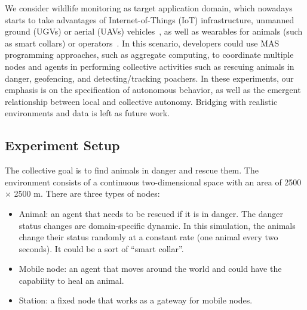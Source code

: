 \documentclass[jsan,article,accept,moreauthors,pdftex]{Definitions/mdpi}
\begin{document}
\begin{paracol}{2}
We consider {wildlife monitoring} as target application domain, which nowadays
 starts to take advantages of Internet-of-Things (IoT) infrastructure, 
 unmanned ground (UGVs) or aerial (UAVs) vehicles~\cite{DBLP:journals/sensors/GonzalezMPJMG16}, as well as 
 wearables for animals (such as smart collars) or operators~\cite{DBLP:conf/ntms/AyeleMH18a}. 
%
In this scenario, developers could 
 use MAS programming approaches,
 such as aggregate computing,
 to coordinate multiple nodes and agents
 in performing collective activities 
 such as rescuing animals in danger, 
 geofencing, 
 and 
 detecting/tracking poachers. 
%
In these experiments, our emphasis is
 on the specification of autonomous behavior,
 as well as the emergent relationship between 
 local and collective autonomy.
%
Bridging with realistic environments and data is left as future work.

\subsection{Experiment Setup} \label{sb:experiment-setup}

The collective goal is to find animals in danger and rescue them.
%
The environment consists of a continuous two-dimensional space 
 with an area of 2500 $\times$ 2500 m. 
%
There are three types of nodes:
\begin{itemize}
\item {Animal}: an agent that needs to be rescued if it is in danger. 
 The danger status changes are domain-specific dynamic. 
 In this simulation, the animals change their 
 status randomly at a constant rate (one animal every two seconds).
 It could be a sort of ``smart collar''.
\item {Mobile node}: an agent that moves around the world 
 and could have the capability to heal an animal.
\item {Station}: a fixed node that works as a gateway for mobile nodes.
\end{itemize}
%


\end{paracol}
\end{document}
